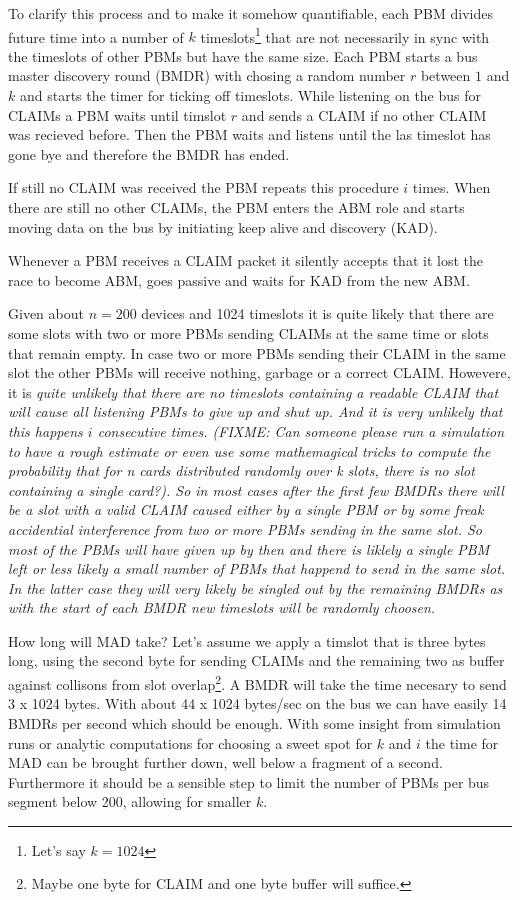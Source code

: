 \documentclass[a4paper,12pt]{scrartcl}
\begin{document}
To clarify this process and to make it somehow quantifiable, each PBM divides future time into a number of
$k$ timeslots\footnote{Let's say $k=1024$} that are not necessarily in sync with the
timeslots of other PBMs but have the same size.
Each PBM starts a bus master discovery round (BMDR) with chosing a random number $r$ between $1$ and $k$ and starts the timer for ticking off timeslots.
While listening on the bus for CLAIMs a PBM waits until timslot $r$ and sends a CLAIM if no other CLAIM was recieved before.
Then the PBM waits and listens until the las timeslot has gone bye and therefore the BMDR has ended.

If still no CLAIM was received the PBM repeats this procedure $i$ times.
When there are still no other CLAIMs, the PBM enters the ABM role and starts moving data on the bus by initiating keep alive and discovery (KAD).

Whenever a PBM receives a CLAIM packet it silently accepts that it lost the race to become ABM, goes passive and waits for KAD from the new ABM.

Given about $n=200$ devices and 1024 timeslots it is quite likely that there are some slots with two or more PBMs sending CLAIMs at the same time or slots that remain empty.
In case two or more PBMs sending their CLAIM in the same slot the other PBMs will receive nothing, garbage or a correct CLAIM.
Howevere, it is \em{quite unlikely} that there are no timeslots containing a readable CLAIM that will cause all listening PBMs to give up and shut up.
And it is \em{very unlikely} that this happens $i$ consecutive times.
(FIXME: Can someone please run a simulation to have a rough estimate or even use some mathemagical tricks to compute the probability that for n cards
distributed randomly over k slots, there is no slot containing a single card?).
So in most cases after the first few BMDRs there will be a slot with a valid CLAIM caused either by a single PBM or by some freak accidential interference from two
or more PBMs sending in the same slot.
So most of the PBMs will have given up by then and there is liklely a single PBM left or less likely a small number of PBMs that happend to send in the same slot. 
In the latter case they will \em{very likely} be singled out by the remaining BMDRs as with the start of each BMDR new timeslots will be randomly choosen.

How long will MAD take? Let's assume we apply a timslot that is three bytes long, using the second byte for sending CLAIMs and the remaining two as
buffer against collisons from slot overlap\footnote{Maybe one byte for CLAIM and one byte buffer will suffice.}.
A BMDR will take the time necesary to send 3 x 1024 bytes.
With about 44 x 1024 bytes/sec on the bus we can have easily 14 BMDRs per second which should be enough.
With some insight from simulation runs or analytic computations for choosing a sweet spot for $k$ and $i$ the time for MAD can be brought further down,
well below a fragment of a second.
Furthermore it should be a sensible step to limit the number of PBMs per bus segment below 200, allowing for smaller $k$.
\end{document}

